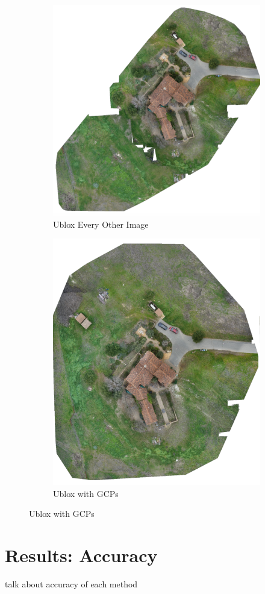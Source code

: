 \documentclass{article}
\begin{document}
\begin{figure}
\begin{subfigure}{.33\textwidth}
  \includegraphics[width=.75\linewidth]{images/orthomosaics/ublox_every_other_image.png}
  \caption{Ublox Every Other Image}
  \label{fig:sub1}
\end{subfigure}%
\begin{subfigure}{.33\textwidth}
  \centering
  \includegraphics[width=.75\linewidth]{images/orthomosaics/ublox_gcp.png}
  \caption{Ublox with GCPs}
  \label{fig:sub1}
\end{subfigure}%
\end{figure}

\section{Results: Accuracy}
talk about accuracy of each method
\end{document}
